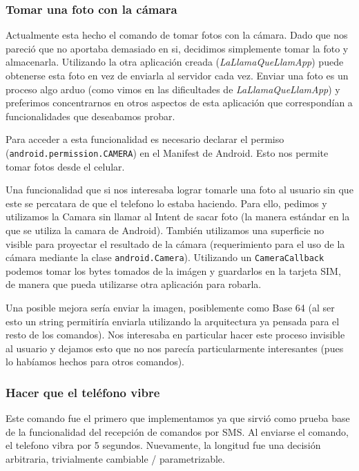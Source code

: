 \subsubsection{Tomar una foto con la cámara}

Actualmente esta hecho el comando de tomar fotos con la cámara. Dado que nos pareció que
no aportaba demasiado en si, decidimos simplemente tomar la foto y almacenarla. Utilizando
la otra aplicación creada (\textit{LaLlamaQueLlamApp}) puede obtenerse esta foto en vez
de enviarla al servidor cada vez. Enviar una foto es un proceso algo arduo (como vimos en las
dificultades de \emph{LaLlamaQueLlamApp}) y preferimos concentrarnos en otros aspectos de esta
aplicación que correspondían a funcionalidades que deseabamos probar.

Para acceder a esta funcionalidad es necesario declarar el permiso
(\texttt{android.permission.CAMERA}) en el Manifest de Android. Esto nos permite
tomar fotos desde el celular.

Una funcionalidad que si nos interesaba lograr tomarle una foto al usuario sin que este se percatara
de que el telefono lo estaba haciendo. Para ello, pedimos y utilizamos la Camara
sin llamar al Intent de sacar foto (la manera estándar en la que se utiliza la
camara de Android). También utilizamos una superficie no visible para proyectar
el resultado de la cámara (requerimiento para el uso de la cámara mediante la
clase \texttt{android.Camera}). Utilizando un \texttt{CameraCallback} podemos
tomar los bytes tomados de la imágen y guardarlos en la tarjeta SIM, de manera
que pueda utilizarse otra aplicación para robarla.

Una posible mejora sería enviar la imagen, posiblemente como Base 64 (al ser
esto un string permitiría enviarla utilizando la arquitectura ya pensada para
el resto de los comandos). Nos interesaba en particular hacer este proceso
invisible al usuario y dejamos esto que no nos parecía particularmente interesantes
(pues lo habíamos hechos para otros comandos).

\subsubsection{Hacer que el teléfono vibre}

Este comando fue el primero que implementamos ya que sirvió como prueba base de la
funcionalidad del recepción de comandos por SMS. Al enviarse el comando, el telefono
vibra por 5 segundos. Nuevamente, la longitud fue una decisión arbitraria, trivialmente cambiable / parametrizable.

